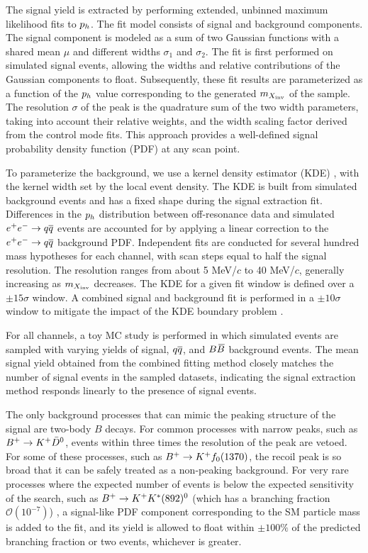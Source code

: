 The signal yield is extracted by performing extended, unbinned maximum likelihood fits to $p_{h}$. The fit model consists of signal and background components. The signal component is modeled as a sum of two Gaussian functions with a shared mean $\mu$ and different widths $\sigma_1$ and $\sigma_2$. The fit is first performed on simulated signal events, allowing the widths and relative contributions of the Gaussian components to float. Subsequently, these fit results are parameterized as a function of the $p_{h}$ value corresponding to the generated $m_{X_{\rm{inv}}}$ of the sample. The resolution $\sigma$ of the peak is the quadrature sum of the two width parameters, taking into account their relative weights, and the width scaling factor derived from the control mode fits. This approach provides a well-defined signal probability density function (PDF) at any scan point.

To parameterize the background, we use a kernel density estimator (KDE) \cite{Cranmer_2001}, with the kernel width set by the local event density. The KDE is built from simulated background events and has a fixed shape during the signal extraction fit. Differences in the $p_{h}$ distribution between off-resonance data and simulated $e^+e^-\rightarrow q\overline q$ events are accounted for by applying a linear correction to the $e^+e^-\rightarrow q\overline q$ background PDF. Independent fits are conducted for several hundred mass hypotheses for each channel, with scan steps equal to half the signal resolution. The resolution ranges from about 5 MeV/$c$ to 40 MeV/$c$, generally increasing as $m_{X_{\rm{inv}}}$ decreases. The KDE for a given fit window is defined over a $\pm15\sigma$ window. A combined signal and background fit is performed in a $\pm10\sigma$ window to mitigate the impact of the KDE boundary problem \cite{Cranmer_2001}.

For all channels, a toy MC study is performed in which simulated events are sampled with varying yields of signal, $q\overline q$, and $B\kern 0.18em\overline{\kern -0.18em B}{}$ background events. The mean signal yield obtained from the combined fitting method closely matches the number of signal events in the sampled datasets, indicating the signal extraction method responds linearly to the presence of signal events.


The only background processes that can mimic the peaking structure of the signal are two-body $B$ decays. For common processes with narrow peaks, such as $B^+ \rightarrow K^+ \kern 0.2em\bar{\kern -0.2em D}{}^0$, events within three times the resolution of the peak are vetoed. For some of these processes, such as $B^+ \rightarrow K^+ f_0(1370)$, the recoil peak is so broad that it can be safely treated as a non-peaking background. For very rare processes where the expected number of events is below the expected sensitivity of the search, such as $B^+\rightarrow K^+ K^\ast(892)^0$ (which has a branching fraction $\mathcal{O}(10^{-7})$) \cite{LHCb:2014lcy}, a signal-like PDF component corresponding to the SM particle mass is added to the fit, and its yield is allowed to float within $\pm100\%$ of the predicted branching fraction or two events, whichever is greater.


